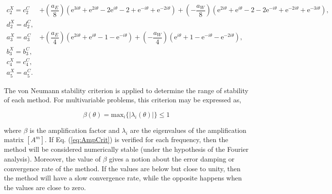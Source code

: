 \documentclass[final,3p,times,11pt,onecolumn]{myElsarticle}
\numberwithin{equation}{section}
\begin{document}
\begin{equation}
\begin{split}
     c^X_2 = c_2^C &+ \left(\dfrac{a_E}{8}\right) \left(\text{e}^{3 i \theta} + \text{e}^{2 i \theta} - 2 \text{e}^{i \theta} - 2 + \text{e}^{-i \theta} + \text{e}^{-2 i \theta}\right) + \left(-\dfrac{a_W}{8}\right) \left(\text{e}^{2 i \theta} + \text{e}^{i \theta} - 2 - 2 \text{e}^{-i \theta} + \text{e}^{-2 i \theta} + \text{e}^{-3 i \theta}\right), \\
     d^X_2 = d^C_2,& \\
     a^X_3 = a^C_3 &+ \left(\dfrac{a_E}{4}\right) \left(\text{e}^{2 i \theta} + \text{e}^{i \theta} - 1 - \text{e}^{-i \theta} \right) + \left(-\dfrac{a_W}{4}\right) \left(\text{e}^{i \theta} + 1 - \text{e}^{- i \theta} - \text{e}^{-2 i \theta} \right), \\
     b^X_3 = b_3^C,& \\ 
     c^X_4 = c^C_4,& \\
     a^X_5 = a^C_5.&     
\end{split}
\end{equation}

The von Neumann stability criterion \cite{hirsch} is applied to determine the range of stability of each method. For multivariable problems, this criterion may be expressed as,

\begin{equation}
\beta(\theta) = \text{max}_i \{ |\lambda_i(\theta)| \} \leq 1
\label{eq:AmpCrit}
\end{equation}

\noindent where $\beta$ is the amplification factor and $\lambda_i$ are the eigenvalues of the amplification matrix $[A^m]$. If Eq. (\ref{eq:AmpCrit}) is verified for each frequency, then the method will be considered numerically stable (under the hypothesis of the Fourier analysis). Moreover, the value of $\beta$ gives a notion about the error damping or convergence rate of the method. If the values are below but close to unity, then the method will have a slow convergence rate, while the opposite happens when the values are close to zero.
\end{document}
